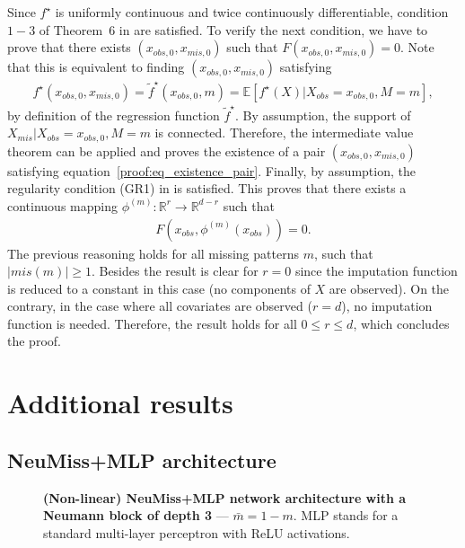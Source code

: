 \documentclass{article}
\newcommand{\RR}{\mathbb{R}}
\newcommand{\E}{\mathbb{E}}
\theoremstyle{plain}
\begin{document}
Since $f^{\star}$ is uniformly continuous and twice continuously differentiable, condition $1-3$ of Theorem~6 in \cite{arutyunov2019application} are satisfied. 
%
To verify the next condition, we have to prove that there exists $(x_{obs, 0}, x_{mis, 0})$ such that $F(x_{obs, 0}, x_{mis, 0}) =0$. 
Note that this is equivalent to finding $(x_{obs, 0}, x_{mis, 0})$ satisfying 
\begin{align}
    f^{\star} (x_{obs, 0}, x_{mis, 0}) = \tilde{f}^{\star}(x_{obs, 0}, m) = \E \left[ f^{\star}(X)| X_{obs} = x_{obs, 0}, M=m\right], 
    \label{proof:eq_existence_pair}
\end{align}
by definition of the regression function $\tilde{f}^{\star}$. By assumption, the support of $X_{mis} | X_{obs} = x_{obs, 0}, M=m$ is connected. Therefore, the intermediate value theorem can be applied and proves the existence of a pair $(x_{obs, 0}, x_{mis, 0})$ satisfying equation~\eqref{proof:eq_existence_pair}. Finally, by assumption, the regularity condition (GR1) in \cite{arutyunov2019application} is satisfied. This proves that there exists a continuous mapping $\phi^{(m)}: \RR^r \to \RR^{d-r}$ such that 
\begin{align}
    F(x_{obs}, \phi^{(m)}(x_{obs})) = 0.   
\end{align}
The previous reasoning holds for all missing patterns $m$, such that $|mis(m)| \geq 1$. Besides the result is clear for $r=0$ since the imputation function is reduced to a constant in this case (no components of $X$ are observed). On the contrary, in the case where all covariates are observed ($r=d$), no imputation function is needed. Therefore, the result holds for all $0 \leq r \leq d$, which concludes the proof. 



\clearpage
\section{Additional results}

\subsection{NeuMiss+MLP architecture}
\label{ss:NeuMiss_archi}
\begin{figure}[h]
    \centering
    \scalebox{.85}{}
    \caption{\textbf{(Non-linear) NeuMiss+MLP network architecture with a Neumann block of depth 3} --- $\bar{m} = 1-m$. MLP stands for a standard multi-layer perceptron with ReLU activations.}
    \label{fig:NeuMiss}
\end{figure}
\end{document}
